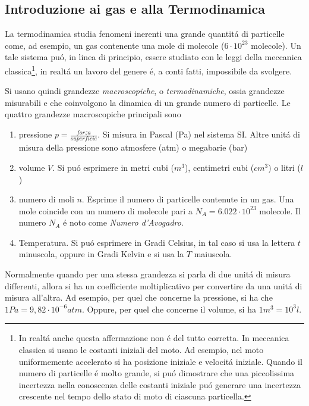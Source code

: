 \documentclass[17pt]{extarticle}
\begin{document}
\subsection{Introduzione ai gas e alla Termodinamica}

La termodinamica studia fenomeni inerenti una grande quantit\'a di particelle come, ad esempio, un gas contenente una mole di molecole ($6\cdot 10^{23}$ molecole). Un tale sistema pu\'o, in linea di principio, essere studiato con le leggi della meccanica classica\footnote{In realt\'a anche questa affermazione non \'e del tutto corretta. In meccanica classica si usano le costanti iniziali del moto. Ad esempio, nel moto uniformemente accelerato si ha posizione iniziale e velocit\'a iniziale. Quando il numero di particelle \'e molto grande, si pu\'o dimostrare che una piccolissima incertezza nella conoscenza delle costanti iniziale pu\'o generare una incertezza crescente nel tempo dello stato di moto di ciascuna particella.}, in realt\'a un lavoro del genere \'e, a conti fatti, impossibile da svolgere.

Si usano quindi grandezze \emph{macroscopiche}, o \emph{termodinamiche}, ossia grandezze misurabili e che coinvolgono la dinamica di un grande numero di particelle. Le quattro grandezze macroscopiche principali sono
\begin{enumerate}
	\item pressione $p = \frac{forza}{superficie}$. Si misura in Pascal (Pa) nel sistema SI. Altre unit\'a di misura della pressione sono atmosfere (atm) o megabarie (bar)
	\item volume $V$. Si pu\'o esprimere in metri cubi ($m^3$), centimetri cubi ($cm^3$) o litri ($l$)
	\item numero di moli $n$. Esprime il numero di particelle contenute in un gas. Una mole coincide con un numero di molecole pari a $N_A = 6.022\cdot 10^{23}$ molecole. Il numero $N_A$ \'e noto come \emph{Numero d'Avogadro}.
	\item Temperatura. Si pu\'o esprimere in Gradi Celsius, in tal caso si usa la lettera $t$ minuscola, oppure in Gradi Kelvin e si usa la $T$ maiuscola.
\end{enumerate}

Normalmente quando per una stessa grandezza si parla di due unit\'a di misura differenti, allora si ha un coefficiente moltiplicativo per convertire da una unit\'a di misura all'altra. Ad esempio, per quel che concerne la pressione, si ha che $1Pa = 9,82\cdot 10^{-6} atm$. Oppure, per quel che concerne il volume, si ha $1m^3 = 10^{3} l$.
\end{document}
